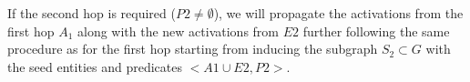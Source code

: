 If the second hop is required ($P2 \neq \emptyset$), we will propagate the activations from the first hop $A_1$ along with the new activations from $E2$ further following the same procedure as for the first hop starting from inducing the subgraph $S_2 \subset G$ with the seed entities and predicates $<A1 \cup E2, P2>$.












